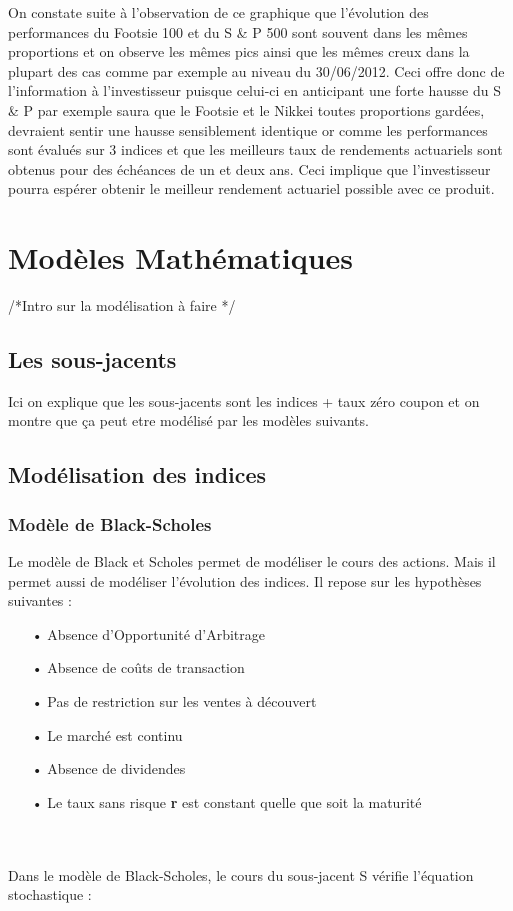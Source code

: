 \documentclass[french,12pt,a4paper]{article}
\begin{document}
On constate suite à l'observation de ce graphique que l'évolution des performances du Footsie 100 et du S \& P 500 sont souvent dans les mêmes proportions et on observe les mêmes pics ainsi que les mêmes creux dans la plupart des cas comme par exemple au niveau du 30/06/2012.
Ceci offre donc de l'information à l'investisseur puisque celui-ci en anticipant une forte hausse du S \& P par exemple saura que le Footsie et le Nikkei toutes proportions gardées, devraient sentir une hausse sensiblement identique or comme les performances sont évalués sur 3 indices et que les meilleurs taux de rendements actuariels sont obtenus pour des échéances de un et deux ans. Ceci implique que l'investisseur pourra espérer obtenir le meilleur rendement actuariel possible avec ce produit.

\newpage


\section{Modèles Mathématiques}
/*Intro sur la modélisation à faire */

\subsection{Les sous-jacents}
Ici on explique que les sous-jacents sont les indices + taux zéro coupon et on montre que ça peut etre modélisé par les modèles suivants.

\subsection{Modélisation des indices}

\subsubsection{Modèle de Black-Scholes}
Le modèle de Black et Scholes permet de modéliser le cours des actions. Mais il permet aussi de modéliser l'évolution des indices. Il repose sur les hypothèses suivantes :
\begin{itemize}
\item[•] Absence d'Opportunité d'Arbitrage
\item[•] Absence de coûts de transaction
\item[•] Pas de restriction sur les ventes à découvert
\item[•] Le marché est continu
\item[•] Absence de dividendes
\item[•] Le taux sans risque \textbf{r} est constant quelle que soit la maturité
\end{itemize}
\\ \\
Dans le modèle de Black-Scholes, le cours du sous-jacent S vérifie l'équation stochastique :
\end{document}
